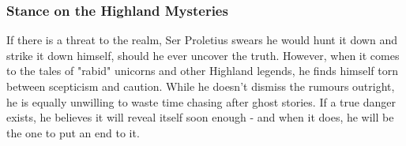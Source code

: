 \subsubsection*{Stance on the Highland Mysteries}
{\entryfont If there is a threat to the realm, Ser Proletius swears he would hunt it down and strike it down himself, should he ever uncover the truth. However, when it comes to the tales of "rabid" unicorns and other Highland legends, he finds himself torn between scepticism and caution. While he doesn't dismiss the rumours outright, he is equally unwilling to waste time chasing after ghost stories. If a true danger exists, he believes it will reveal itself soon enough - and when it does, he will be the one to put an end to it.}